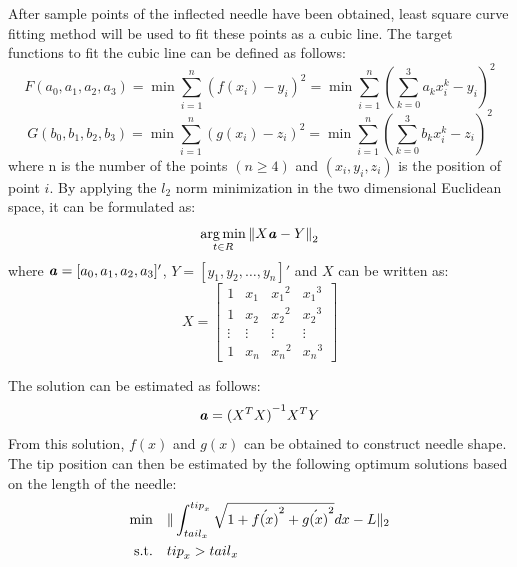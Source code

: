\documentclass[journal,article,submit,moreauthors,pdftex]{Definitions/mdpi}
\begin{document}
After sample points of the inflected needle have been obtained, least square curve fitting method will be used to fit these points as a cubic line. The target functions to fit the cubic line can be defined as follows:
\begin{equation}
F(a_0,a_1,a_2,a_3)=\min\sum_{i=1}^{n}(f(x_i)-y_i)^2 =\min\sum_{i=1}^{n}(\sum_{k=0}^{3}a_k x_i^k-y_i)^2
\end{equation}
\begin{equation}
G(b_0,b_1,b_2,b_3)=\min\sum_{i=1}^{n}(g(x_i)-z_i)^2 =\min\sum_{i=1}^{n}(\sum_{k=0}^{3}b_k x_i^k-z_i)^2
\end{equation}
where n is the number of the points ${(n\geq4)}$ and ${(x_i,y_i,z_i)}$ is the position of point ${i}$. By applying the ${l_2}$ norm minimization in the two dimensional Euclidean space, it can be formulated as:
\begin{equation}
\mathop{\arg\min}_{t\in R} {\|X{\textbf{\textit{a}}}-Y\|}_2
\end{equation}
where ${{\textbf{\textit{a}}}=[a_0,a_1,a_2,a_3]'}$, ${Y=[y_1,y_2,\ldots,y_n]'}$ and ${X}$ can be written as:
\begin{equation}
X= \begin{bmatrix}
1&x_1&{x_1}^2&{x_1}^3\\
1&x_2&{x_2}^2&{x_2}^3\\
\vdots&\vdots&\vdots&\vdots\\
1&x_n&{x_n}^2&{x_n}^3
\end{bmatrix}
\end{equation}

The solution can be estimated as follows:
\begin{equation}
{\textbf{\textit{a}}}={(X^T X)}^{-1} X^T  Y
\end{equation}
From this solution, ${f(x)}$ and ${g(x)}$ can be obtained to construct needle shape. The tip position can then be estimated by the following optimum solutions based on the length of the needle:
\begin{equation}
\centering
\begin{aligned}
\textrm{min} \quad & \|\int_{{tail}_x}^{{tip}_x}\sqrt{1+{\acute{f(x)}}^2+{\acute{g(x)}}^2 }dx-L\|_2\\
\textrm{s.t.} \quad & {tip}_x>{tail}_x \\
\end{aligned}
\end{equation}
\end{document}

